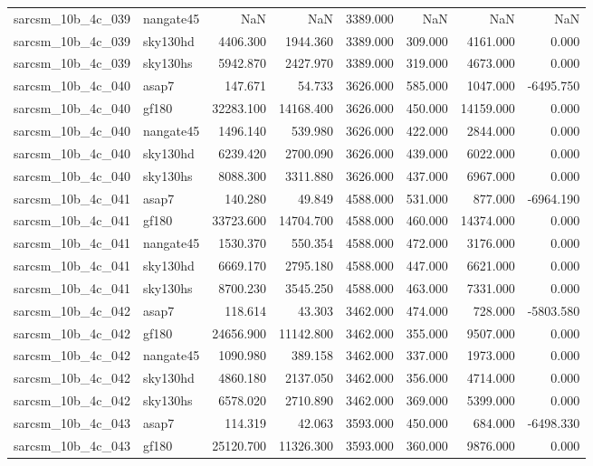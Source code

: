 \begin{tabular}{llrrrrrr}
sarcsm\_10b\_4c\_039 & nangate45 & NaN & NaN & 3389.000 & NaN & NaN & NaN \\
sarcsm\_10b\_4c\_039 & sky130hd & 4406.300 & 1944.360 & 3389.000 & 309.000 & 4161.000 & 0.000 \\
sarcsm\_10b\_4c\_039 & sky130hs & 5942.870 & 2427.970 & 3389.000 & 319.000 & 4673.000 & 0.000 \\
sarcsm\_10b\_4c\_040 & asap7 & 147.671 & 54.733 & 3626.000 & 585.000 & 1047.000 & -6495.750 \\
sarcsm\_10b\_4c\_040 & gf180 & 32283.100 & 14168.400 & 3626.000 & 450.000 & 14159.000 & 0.000 \\
sarcsm\_10b\_4c\_040 & nangate45 & 1496.140 & 539.980 & 3626.000 & 422.000 & 2844.000 & 0.000 \\
sarcsm\_10b\_4c\_040 & sky130hd & 6239.420 & 2700.090 & 3626.000 & 439.000 & 6022.000 & 0.000 \\
sarcsm\_10b\_4c\_040 & sky130hs & 8088.300 & 3311.880 & 3626.000 & 437.000 & 6967.000 & 0.000 \\
sarcsm\_10b\_4c\_041 & asap7 & 140.280 & 49.849 & 4588.000 & 531.000 & 877.000 & -6964.190 \\
sarcsm\_10b\_4c\_041 & gf180 & 33723.600 & 14704.700 & 4588.000 & 460.000 & 14374.000 & 0.000 \\
sarcsm\_10b\_4c\_041 & nangate45 & 1530.370 & 550.354 & 4588.000 & 472.000 & 3176.000 & 0.000 \\
sarcsm\_10b\_4c\_041 & sky130hd & 6669.170 & 2795.180 & 4588.000 & 447.000 & 6621.000 & 0.000 \\
sarcsm\_10b\_4c\_041 & sky130hs & 8700.230 & 3545.250 & 4588.000 & 463.000 & 7331.000 & 0.000 \\
sarcsm\_10b\_4c\_042 & asap7 & 118.614 & 43.303 & 3462.000 & 474.000 & 728.000 & -5803.580 \\
sarcsm\_10b\_4c\_042 & gf180 & 24656.900 & 11142.800 & 3462.000 & 355.000 & 9507.000 & 0.000 \\
sarcsm\_10b\_4c\_042 & nangate45 & 1090.980 & 389.158 & 3462.000 & 337.000 & 1973.000 & 0.000 \\
sarcsm\_10b\_4c\_042 & sky130hd & 4860.180 & 2137.050 & 3462.000 & 356.000 & 4714.000 & 0.000 \\
sarcsm\_10b\_4c\_042 & sky130hs & 6578.020 & 2710.890 & 3462.000 & 369.000 & 5399.000 & 0.000 \\
sarcsm\_10b\_4c\_043 & asap7 & 114.319 & 42.063 & 3593.000 & 450.000 & 684.000 & -6498.330 \\
sarcsm\_10b\_4c\_043 & gf180 & 25120.700 & 11326.300 & 3593.000 & 360.000 & 9876.000 & 0.000 \\

\end{tabular}
